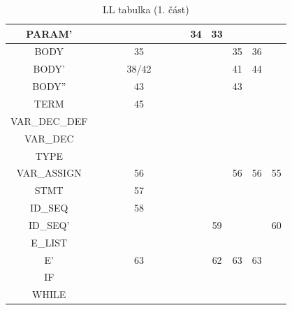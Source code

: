 \documentclass[11pt,a4paper]{article}
\begin{document}
\begin{table}[ht!]
\begin{tabular}{|c|c|c|c|c|c|c|c|c|c|c|c|l|}
        PARAM' &  &  &  &  &  &  &  & 34 & 33 &  &  &  \\ \hline
        BODY &  &  &  & 35 &  &  &  &  &  & 35 & 36 &  \\ \hline
        BODY' &  &  &  & \cellcolor[HTML]{FFCCC9}38/42 &  &  &  &  &  & 41 & 44 &  \\ \hline
        BODY'' &  &  &  & 43 &  &  &  &  &  & 43 &  &  \\ \hline
        TERM &  &  &  & 45 &  &  &  &  &  &  &  &  \\ \hline
        VAR\_DEC\_DEF &  &  &  &  &  &  &  &  &  &  &  &  \\ \hline
        VAR\_DEC &  &  &  &  &  &  &  &  &  &  &  &  \\ \hline
        TYPE &  &  &  &  &  &  &  &  &  &  &  &  \\ \hline
        VAR\_ASSIGN &  &  &  & 56 &  &  &  &  &  & 56 & 56 & 55 \\ \hline
        STMT &  &  &  & 57 &  &  &  &  &  &  &  &  \\ \hline
        ID\_SEQ &  &  &  & 58 &  &  &  &  &  &  &  &  \\ \hline
        ID\_SEQ' &  &  &  &  &  &  &  &  & 59 &  &  & 60 \\ \hline
        E\_LIST &  &  &  &  &  &  &  &  &  &  &  &  \\ \hline
        E' &  &  &  & 63 &  &  &  &  & 62 & 63 & 63 &  \\ \hline
        IF &  &  &  &  &  &  &  &  &  &  &  &  \\ \hline
        WHILE &  &  &  &  &  &  &  &  &  &  &  &  \\ \hline
        \end{tabular}
        \caption{LL tabulka (1. část)}
        \label{tab:ll-tab-1}
        \end{table}
\end{document}
